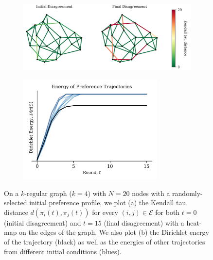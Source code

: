 \documentclass[conference]{ieeeconf}
\newcommand{\E}{\mathcal{E}}
\begin{document}
\begin{figure}[ht]
    \begin{subfigure}[b]{0.6\textwidth}
    \includegraphics[width=\textwidth]{figs/fig2alt.png}
    \caption{}
    \label{fig:2a}
    \end{subfigure}
    \hfill
    \begin{subfigure}[b]{0.4\textwidth}
    \centering
    \includegraphics[width=0.8\textwidth]{figs/fig2balt.png}
    \caption{}
    \label{fig:2b}
    \end{subfigure}
    \caption{On a $k$-regular graph ($k=4$) with $N =20$ nodes with a randomly-selected initial preference profile, we plot (a) the Kendall tau distance $d(\pi_i(t),\pi_j(t))$ for every $(i,j) \in \E$ for both $t=0$ (initial disagreement) and $t=15$ (final disagreement) with a heat-map on the edges of the graph. We also plot (b) the Dirichlet energy of the trajectory (black) as well as the energies of other trajectories from different initial conditions (blues).}
    \label{fig:2}
    \vspace{-1em}
\end{figure}


\vspace{-1em}


\end{document}
